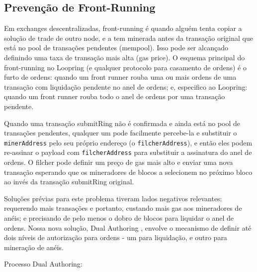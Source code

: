 \documentclass[UTF8,nofonts]{article}
\begin{document}
\begin{multicols}{2}
\subsection{Prevenção de Front-Running\label{sec:dual_authoring}}
Em exchanges descentralizadas, front-running é quando alguém tenta copiar a solução de trade de outro node, e a tem minerada antes da transação original que está no pool de transações pendentes (mempool). Isso pode ser alcançado definindo uma taxa de transação mais alta (gas price). O esquema principal do front-running no Loopring (e qualquer protocolo para casamento de ordens) é o furto de ordens: quando um front runner rouba uma ou mais ordens de uma transação com liquidação pendente no anel de ordens; e, especifico ao Loopring: quando um front runner rouba todo o anel de ordens por uma transação pendente.

Quando uma transação submitRing não é confirmada e ainda está no pool de transações pendentes, qualquer um pode facilmente percebe-la e substituir o \verb|minerAddress| pelo seu próprio endereço (o \verb|filcherAddress|), e então eles podem re-assinar o payload com \verb|filcherAddress| para substituir a assinatura do anel de ordens. O filcher pode definir um preço de gas mais alto e enviar uma nova transação esperando que os mineradores de blocos a selecionem no próximo bloco ao invés da transação submitRing original.

Soluções prévias para este problema tiveram lados negativos relevantes: requerendo mais transações e portanto, custando mais gas aos mineradores de anéis; e precisando de pelo menos o dobro de blocos para liquidar o anel de ordens. Nossa nova solução, Dual Authoring \cite{dualauthor}, envolve o mecanismo de definir até dois níveis de autorização para ordens - um para liquidação, e outro para mineração de anéis.
\newline

Processo Dual Authoring:


\end{multicols}
\end{document}
